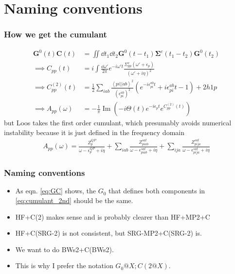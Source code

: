 \section{Naming conventions}
\begin{frame}
    \frametitle{How we get the cumulant}
\begin{align}
    \bm{G}^0(t) \bm{C}(t) &= \iint \dd t_1 \dd t_2 \bm{G}^0(t-t_1) \bm{\Sigma}^c(t_1 - t_2) \bm{G}^0(t_2) \label{eq:GC} \\
\implies C_{pp}(t)&= i\int  \frac{\dd \omega'}{2\pi} e^{-i\omega' t} \frac{{\Sigma}_{pp}^c(\omega' + \epsilon_p)}{(\omega' + i\eta)^2} \label{eq:Cpp_0} \\
\implies C^{(2)}_{pp}(t)&= \frac{1}{2}\sum_{iab} \frac{\left< pi \left| \right| ab \right>^2}{\left(\epsilon_{pi}^{ab}\right)^2}
\left(e^{-i \epsilon_{pi}^{ab} t} +i \epsilon_{pi}^{ab} t -1 \right)
+2h1p \\
\implies A_{pp}(\omega) &= -\frac{1}{\pi} \operatorname{Im} \left(-i \Theta(t) e^{-i\epsilon_p t} e^{C^{(2)}_{pp}(t)} \right)
\label{eq:cumulant_2nd}
\end{align}
but Loos takes the first order cumulant, which presumably avoids numerical instability because it is just defined in the frequency domain
\begin{align}
    A_{pp}(\omega) = \frac{Z_p^{QP}}{\omega - \epsilon_p^{QP} + i\eta} + \sum_{i a b} \frac{Z_{piab}^{sat}}{\omega - \epsilon_{piab}^{sat} + i\eta} + \sum_{i j a} \frac{Z_{pija}^{sat}}{\omega - \epsilon_{pija}^{sat} + i\eta}
\end{align}
\end{frame}
\begin{frame}
    \frametitle{Naming conventions}
    \begin{itemize}
        \item As eqn. \ref{eq:GC} shows, the $G_0$ that defines both components in \ref{eq:cumulant_2nd} should be the same.
        \item HF+C(2) makes sense and is probably clearer than HF+MP2+C
        \item HF+C(SRG-2) is not consistent, but SRG-MP2+C(SRG-2) is.
        \item We want to do BWs2+C(BWs2).
        \item This is why I prefer the notation $G_0@X;C(2@X)$.
    \end{itemize}
\end{frame}
